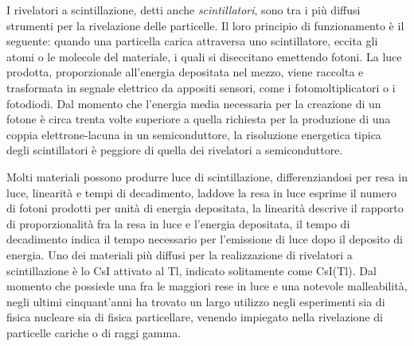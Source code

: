 I rivelatori a scintillazione, detti anche \emph{scintillatori}, sono tra i più diffusi strumenti per la rivelazione delle particelle.
Il loro principio di funzionamento è il seguente: quando una particella carica attraversa uno scintillatore, eccita gli atomi o le molecole del materiale, i quali si diseccitano emettendo fotoni. 
La luce prodotta, proporzionale all'energia depositata nel mezzo, viene raccolta e trasformata in segnale elettrico da appositi sensori, come i fotomoltiplicatori o i fotodiodi.
Dal momento che l'energia media necessaria per la creazione di un fotone è circa trenta volte superiore a quella richiesta per la produzione di una coppia elettrone-lacuna in un semiconduttore, la risoluzione energetica tipica degli scintillatori è peggiore di quella dei rivelatori a semiconduttore.

Molti materiali possono produrre luce di scintillazione, differenziandosi per resa in luce, linearità e tempi di decadimento, laddove la resa in luce esprime il numero di fotoni prodotti per unità di energia depositata, la linearità descrive il rapporto di proporzionalità fra la resa in luce e l'energia depositata, il tempo di decadimento indica il tempo necessario per l'emissione di luce dopo il deposito di energia.
Uno dei materiali più diffusi per la realizzazione di rivelatori a scintillazione è lo CsI attivato al Tl, indicato solitamente come CsI(Tl). 
Dal momento che possiede una fra le maggiori rese in luce e una notevole malleabilità, negli ultimi cinquant'anni ha trovato un largo utilizzo negli esperimenti sia di fisica nucleare sia di fisica particellare, venendo impiegato nella rivelazione di particelle cariche o di raggi gamma.


